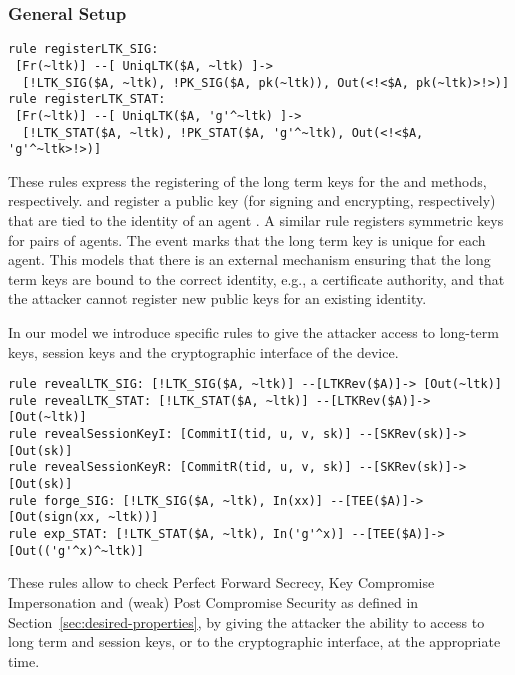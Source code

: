 \subsubsection{General Setup}
\begin{lstlisting}
rule registerLTK_SIG:
 [Fr(~ltk)] --[ UniqLTK($A, ~ltk) ]->
  [!LTK_SIG($A, ~ltk), !PK_SIG($A, pk(~ltk)), Out(<!<$A, pk(~ltk)>!>)]
rule registerLTK_STAT:
 [Fr(~ltk)] --[ UniqLTK($A, 'g'^~ltk) ]->
  [!LTK_STAT($A, ~ltk), !PK_STAT($A, 'g'^~ltk), Out(<!<$A, 'g'^~ltk>!>)]
\end{lstlisting}

These rules express the registering of the long term keys for the \mSig{} and
\mStat{} methods, respectively.
%
 and  register a public key (for
signing and encrypting, respectively) that are tied to the identity of an agent
. A similar rule  registers symmetric keys for pairs
of agents.
%
The event  marks that the long term key is unique for each
agent.
This models that there is an external mechanism ensuring that the
long term keys are bound to the correct identity, e.g., a certificate authority,
and that the attacker cannot register new public keys for an existing identity.

In our model we introduce specific rules to give the attacker access to
long-term keys, session keys and the cryptographic interface of the device.
\begin{lstlisting}
rule revealLTK_SIG: [!LTK_SIG($A, ~ltk)] --[LTKRev($A)]-> [Out(~ltk)]
rule revealLTK_STAT: [!LTK_STAT($A, ~ltk)] --[LTKRev($A)]-> [Out(~ltk)]
rule revealSessionKeyI: [CommitI(tid, u, v, sk)] --[SKRev(sk)]-> [Out(sk)]
rule revealSessionKeyR: [CommitR(tid, u, v, sk)] --[SKRev(sk)]-> [Out(sk)]
rule forge_SIG: [!LTK_SIG($A, ~ltk), In(xx)] --[TEE($A)]-> [Out(sign(xx, ~ltk))]
rule exp_STAT: [!LTK_STAT($A, ~ltk), In('g'^x)] --[TEE($A)]-> [Out(('g'^x)^~ltk)]
\end{lstlisting}
These rules allow to check Perfect Forward Secrecy, Key Compromise Impersonation
and (weak) Post Compromise Security as defined in Section~\ref{sec:desired-properties},
by giving the attacker the ability to access to long term and session keys, or
to the cryptographic interface, at the appropriate time.

